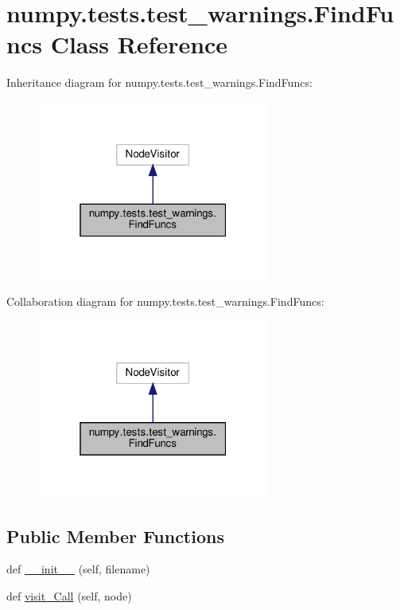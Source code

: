 \hypertarget{classnumpy_1_1tests_1_1test__warnings_1_1FindFuncs}{}\section{numpy.\+tests.\+test\+\_\+warnings.\+Find\+Funcs Class Reference}
\label{classnumpy_1_1tests_1_1test__warnings_1_1FindFuncs}


Inheritance diagram for numpy.\+tests.\+test\+\_\+warnings.\+Find\+Funcs\+:
\nopagebreak
\begin{figure}[H]
\begin{center}
\leavevmode
\includegraphics[width=217pt]{classnumpy_1_1tests_1_1test__warnings_1_1FindFuncs__inherit__graph}
\end{center}
\end{figure}


Collaboration diagram for numpy.\+tests.\+test\+\_\+warnings.\+Find\+Funcs\+:
\nopagebreak
\begin{figure}[H]
\begin{center}
\leavevmode
\includegraphics[width=217pt]{classnumpy_1_1tests_1_1test__warnings_1_1FindFuncs__coll__graph}
\end{center}
\end{figure}
\subsection*{Public Member Functions}
\begin{DoxyCompactItemize}
\item 
def \hyperlink{classnumpy_1_1tests_1_1test__warnings_1_1FindFuncs_ad3ab373b5350fb7945e8d3adc2e9b5f8}{\+\_\+\+\_\+init\+\_\+\+\_\+} (self, filename)
\item 
def \hyperlink{classnumpy_1_1tests_1_1test__warnings_1_1FindFuncs_abac7b64d197b65afa8c96b93d47806d0}{visit\+\_\+\+Call} (self, node)
\end{DoxyCompactItemize}


